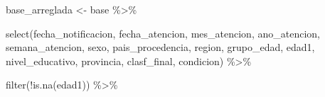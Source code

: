 \documentclass[
  letterpaper,
  DIV=11,
  numbers=noendperiod]{scrreprt}
\newenvironment{Shaded}{\begin{snugshade}}{\end{snugshade}}
\newcommand{\FunctionTok}[1]{\textcolor[rgb]{0.28,0.35,0.67}{#1}}
\newcommand{\NormalTok}[1]{\textcolor[rgb]{0.00,0.23,0.31}{#1}}
\newcommand{\OtherTok}[1]{\textcolor[rgb]{0.00,0.23,0.31}{#1}}
\newcommand{\SpecialCharTok}[1]{\textcolor[rgb]{0.37,0.37,0.37}{#1}}
\begin{document}
\begin{Shaded}
\begin{Highlighting}[]
\NormalTok{base\_arreglada }\OtherTok{\textless{}{-}}\NormalTok{ base }\SpecialCharTok{\%\textgreater{}\%}

  \FunctionTok{select}\NormalTok{(fecha\_notificacion,}
\NormalTok{         fecha\_atencion,}
\NormalTok{         mes\_atencion,}
\NormalTok{         ano\_atencion,}
\NormalTok{         semana\_atencion,}
\NormalTok{         sexo,}
\NormalTok{         pais\_procedencia,}
\NormalTok{         region,}
\NormalTok{         grupo\_edad,}
\NormalTok{         edad1,}
\NormalTok{         nivel\_educativo,}
\NormalTok{         provincia,}
\NormalTok{         clasf\_final,}
\NormalTok{         condicion) }\SpecialCharTok{\%\textgreater{}\%} 
  
  \FunctionTok{filter}\NormalTok{(}\SpecialCharTok{!}\FunctionTok{is.na}\NormalTok{(edad1)) }\SpecialCharTok{\%\textgreater{}\%}  
  

\end{Highlighting}
\end{Shaded}
\end{document}
